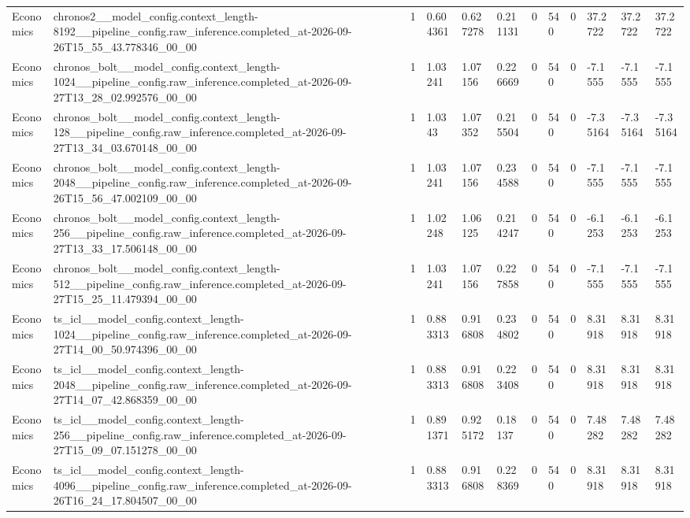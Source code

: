\begin{tabular}{llllllllllll}
Economics & chronos2\_\_model\_config.context\_length-8192\_\_pipeline\_config.raw\_inference.completed\_at-2026-09-26T15\_55\_43.778346\_00\_00 & 1 & 0.604361 & 0.627278 & 0.211131 & 0 & 540 & 0 & 37.2722 & 37.2722 & 37.2722 \\
Economics & chronos\_bolt\_\_model\_config.context\_length-1024\_\_pipeline\_config.raw\_inference.completed\_at-2026-09-27T13\_28\_02.992576\_00\_00 & 1 & 1.03241 & 1.07156 & 0.226669 & 0 & 540 & 0 & -7.1555 & -7.1555 & -7.1555 \\
Economics & chronos\_bolt\_\_model\_config.context\_length-128\_\_pipeline\_config.raw\_inference.completed\_at-2026-09-27T13\_34\_03.670148\_00\_00 & 1 & 1.0343 & 1.07352 & 0.215504 & 0 & 540 & 0 & -7.35164 & -7.35164 & -7.35164 \\
Economics & chronos\_bolt\_\_model\_config.context\_length-2048\_\_pipeline\_config.raw\_inference.completed\_at-2026-09-26T15\_56\_47.002109\_00\_00 & 1 & 1.03241 & 1.07156 & 0.234588 & 0 & 540 & 0 & -7.1555 & -7.1555 & -7.1555 \\
Economics & chronos\_bolt\_\_model\_config.context\_length-256\_\_pipeline\_config.raw\_inference.completed\_at-2026-09-27T13\_33\_17.506148\_00\_00 & 1 & 1.02248 & 1.06125 & 0.214247 & 0 & 540 & 0 & -6.1253 & -6.1253 & -6.1253 \\
Economics & chronos\_bolt\_\_model\_config.context\_length-512\_\_pipeline\_config.raw\_inference.completed\_at-2026-09-27T15\_25\_11.479394\_00\_00 & 1 & 1.03241 & 1.07156 & 0.227858 & 0 & 540 & 0 & -7.1555 & -7.1555 & -7.1555 \\
Economics & ts\_icl\_\_model\_config.context\_length-1024\_\_pipeline\_config.raw\_inference.completed\_at-2026-09-27T14\_00\_50.974396\_00\_00 & 1 & 0.883313 & 0.916808 & 0.234802 & 0 & 540 & 0 & 8.31918 & 8.31918 & 8.31918 \\
Economics & ts\_icl\_\_model\_config.context\_length-2048\_\_pipeline\_config.raw\_inference.completed\_at-2026-09-27T14\_07\_42.868359\_00\_00 & 1 & 0.883313 & 0.916808 & 0.223408 & 0 & 540 & 0 & 8.31918 & 8.31918 & 8.31918 \\
Economics & ts\_icl\_\_model\_config.context\_length-256\_\_pipeline\_config.raw\_inference.completed\_at-2026-09-27T15\_09\_07.151278\_00\_00 & 1 & 0.891371 & 0.925172 & 0.18137 & 0 & 540 & 0 & 7.48282 & 7.48282 & 7.48282 \\
Economics & ts\_icl\_\_model\_config.context\_length-4096\_\_pipeline\_config.raw\_inference.completed\_at-2026-09-26T16\_24\_17.804507\_00\_00 & 1 & 0.883313 & 0.916808 & 0.228369 & 0 & 540 & 0 & 8.31918 & 8.31918 & 8.31918 \\

\end{tabular}
